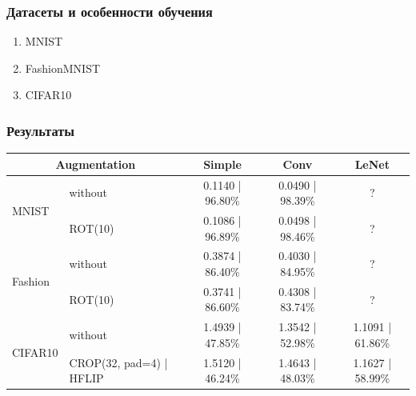 \documentclass{beamer}
\begin{document}
\begin{frame}
  \frametitle{Датасеты и особенности обучения}
  \begin{enumerate}
  \item MNIST
  \item FashionMNIST
  \item CIFAR10
  \end{enumerate}
  
\end{frame}

\begin{frame}
  \frametitle{Результаты}
  \small
  \begin{tabular}[H]{|m{1.2cm}|m{2cm}|c|c|c|}
    \hline
    \multicolumn{2}{|c|}{Augmentation} & Simple         & Conv             & LeNet \\
    \hline
    \multirow{2}{*}{MNIST} & without & 0.1140 | 96.80\% & 0.0490 | 98.39\% & ?     \\
    \cline{2-5}
                           & ROT(10) & 0.1086 | 96.89\% & 0.0498 | 98.46\% & ?     \\

    \hline
    \multirow{2}{*}{Fashion} & without & 0.3874 | 86.40\% & 0.4030 | 84.95\% & ?\\
    \cline{2-5}
                                  & ROT(10) & 0.3741 | 86.60\% & 0.4308 | 83.74\% & ?\\
    
    \hline
    \multirow{2}{*}{CIFAR10} & without & 1.4939 | 47.85\% & 1.3542 | 52.98\% & 1.1091 | 61.86\%\\
    \cline{2-5}
             & CROP(32, pad=4) | HFLIP & 1.5120 | 46.24\% & 1.4643 | 48.03\% & 1.1627 | 58.99\% \\
    \hline
    
  \end{tabular}

\end{frame}
\end{document}
